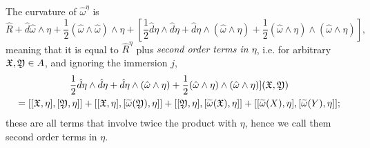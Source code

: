 The curvature of $\hat \omega^\eta$ is 
$$\hat R + \hat d \hat \omega \wedge \eta + \frac{1}{2} (\hat \omega \wedge \hat \omega) \wedge \eta + [\frac{1}{2} \hat d \eta \wedge \hat d \eta + \hat d \eta \wedge (\hat \omega \wedge \eta) + \frac{1}{2} (\hat \omega \wedge \eta) \wedge (\hat \omega \wedge \eta)],$$ 
meaning that it is equal to $\hat R^\eta$ plus \emph{second order terms in $\eta$}, i.e. for arbitrary $\mathfrak{X}, \mathfrak{Y} \in A$, and ignoring the immersion $j$, 
\begin{multline*}\frac{1}{2} \hat d \eta \wedge \hat d \eta + \hat d \eta \wedge (\hat \omega \wedge \eta) + \frac{1}{2} (\hat \omega \wedge \eta) \wedge (\hat \omega \wedge \eta)](\mathfrak{X}, \mathfrak{Y}) 
\\= [[\mathfrak{X}, \eta], [\mathfrak{Y}, \eta]] + [[\mathfrak{X}, \eta], [\widetilde \omega(\mathfrak{Y}), \eta]] + [[\mathfrak{Y}, \eta], [\widetilde \omega(\mathfrak{X}), \eta]] + [[\widetilde \omega(X), \eta], [\widetilde \omega(Y), \eta]];
\end{multline*}
these are all terms that involve twice the product with $\eta$, hence we call them second order terms in $\eta$.

